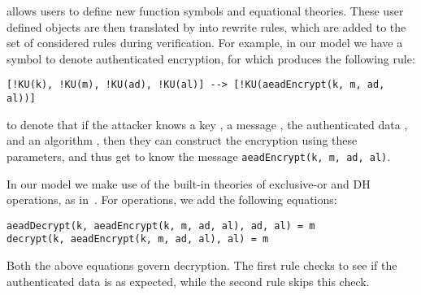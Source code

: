 
\mTamarin{} allows users to define new function symbols and equational theories.
These user defined objects are then translated by \mTamarin{} into rewrite
rules, which are added to the set of considered rules during verification.
For example, in our model we have a symbol to denote authenticated encryption, for which \mTamarin{} produces the following rule:
%
\begin{lstlisting}
[!KU(k), !KU(m), !KU(ad), !KU(al)] --> [!KU(aeadEncrypt(k, m, ad, al))]
\end{lstlisting}
%
to denote that if the attacker knows a key , a message , the
authenticated data , and an algorithm , then they can construct
the encryption using these parameters, and thus get to know the message
\lstinline{aeadEncrypt(k, m, ad, al)}.

In our model we make use of
the built-in theories of exclusive-or and DH operations, as in~\cite{DBLP:conf/csfw/DreierHRS18,DBLP:conf/csfw/SchmidtMCB12}.
%
%
For \mAead{} operations, we add the following equations:
\begin{lstlisting}
aeadDecrypt(k, aeadEncrypt(k, m, ad, al), ad, al) = m
decrypt(k, aeadEncrypt(k, m, ad, al), al) = m
\end{lstlisting}
Both the above equations govern decryption. The first rule checks to see if the authenticated data is as expected, while the second rule skips this check.


